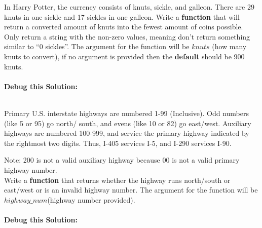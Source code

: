 


	\item 
		In Harry Potter, the currency consists of knuts, sickle, and galleon. There are 29 knuts in 
		one sickle and 17 sickles in one galleon. Write a \textbf{function} that will return a 
		converted amount of knuts into the fewest amount of coins possible. Only return a string 
		with the non-zero values, meaning don't return something similar to ``0 sickles''. The 
		argument for the function will be $knuts$ (how many knuts to convert), if no argument is 
		provided then the \textbf{default} should be 900 knuts. \\ \\
		\textbf{Debug this Solution:}\\
		\mbox{ \hspace*{0.25in}	}

\pagebreak



	\item 
		Primary U.S. interstate highways are numbered 1-99 (Inclusive).  Odd numbers (like 5 or 95) go north/
		south, and evens (like 10 or 82) go east/west.  Auxiliary highways are numbered 100-999, and 
		service the primary highway indicated by the rightmost two digits.  Thus, I-405 services 
		I-5, and I-290 services I-90.
		
		Note: 200 is not a valid auxiliary highway because 00 is not a valid primary highway 
		number.\\
		
		Write a \textbf{function} that returns whether the highway runs north/south or east/west or is an 
		invalid highway number. The argument for the function 
		will be $highway\_num$(highway number provided). \\ \\
		\textbf{Debug this Solution:}\\
		\mbox{ \hspace*{0.25in}	}

\pagebreak



